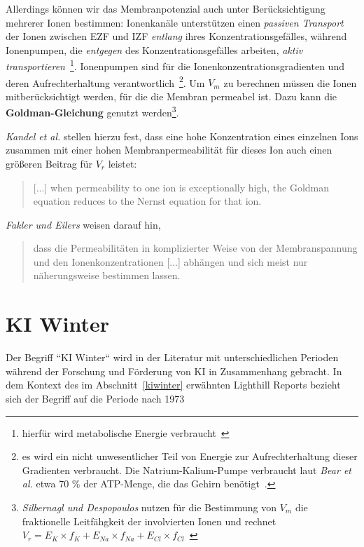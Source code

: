 Allerdings können wir das Membranpotenzial auch unter Berücksichtigung mehrerer Ionen bestimmen: Ionenkanäle unterstützen einen \textit{passiven Transport} der Ionen zwischen EZF und IZF \textit{entlang} ihres Konzentrationsgefälles, während Ionenpumpen, die \textit{entgegen} des Konzentrationsgefälles arbeiten, \textit{aktiv transportieren}~\cite[30]{Fro19}\footnote{
    hierfür wird metabolische Energie verbraucht~\cite[31]{Fro19}
}.
Ionenpumpen sind für die Ionenkonzentrationsgradienten und deren Aufrechterhaltung verantwortlich~\cite[76]{BCP18}\footnote{
    es wird ein nicht unwesentlicher Teil von Energie zur Aufrechterhaltung dieser Gradienten verbraucht. Die Natrium-Kalium-Pumpe verbraucht laut \textit{Bear et al.} etwa 70 \% der ATP-Menge, die das Gehirn benötigt~\cite[76]{BCP18}.
}.
Um $V_m$ zu berechnen müssen die Ionen mitberücksichtigt werden, für die die Membran permeabel ist.
Dazu kann die \textbf{Goldman-Gleichung} genutzt werden\footnote{
    \textit{Silbernagl und Despopoulos} nutzen für die Bestimmung von $V_m$ die fraktionelle Leitfähgkeit der involvierten Ionen und rechnet $V_r = E_K \times f_K + E_{Na}  \times f_{Na} + E_{Cl}  \times f_{Cl}$~\cite[32, 1.21]{SD07}
}.

\textit{Kandel et al.} stellen hierzu fest, dass eine hohe Konzentration eines einzelnen Ions zusammen mit einer hohen Membranpermeabilität für dieses Ion auch einen größeren Beitrag für $V_r$ leistet:

\blockquote[{\cite[135]{KSJ+13}}]{
    {[...]} when permeability to one ion is exceptionally high, the Goldman equation reduces to the Nernst equation for that ion.
}

\textit{Fakler und Eilers} weisen darauf hin,

\blockquote[{\cite[67]{FE19}}]{
    dass die Permeabilitäten in komplizierter Weise von der Membranspannung und den Ionenkonzentrationen {[...]} abhängen und sich meist nur näherungsweise bestimmen lassen.
}




\section{KI Winter}\label{appendix:kiwinter}

Der Begriff ``KI Winter`` wird in der Literatur mit unterschiedlichen Perioden während der Forschung und Förderung von KI in Zusammenhang gebracht.
In dem Kontext des im Abschnitt~\ref{kiwinter} erwähnten Lighthill Reports bezieht sich der Begriff auf die Periode nach 1973

